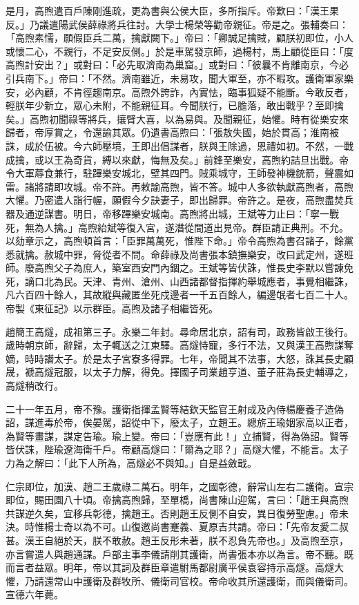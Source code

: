 是月，高煦遣百戶陳剛進疏，更為書與公侯大臣，多所指斥。帝歎曰：「漢王果反。」乃議遣陽武侯薛祿將兵往討。大學士楊榮等勸帝親征。帝是之。張輔奏曰：「高煦素懦，願假臣兵二萬，擒獻闕下。」帝曰：「卿誠足擒賊，顧朕初即位，小人或懷二心，不親行，不足安反側。」於是車駕發京師，過楊村，馬上顧從臣曰：「度高煦計安出？」或對曰：「必先取濟南為巢窟。」或對曰：「彼曩不肯離南京，今必引兵南下。」帝曰：「不然。濟南雖近，未易攻，聞大軍至，亦不暇攻。護衛軍家樂安，必內顧，不肯徑趨南京。高煦外誇詐，內實怯，臨事狐疑不能斷。今敢反者，輕朕年少新立，眾心未附，不能親征耳。今聞朕行，已膽落，敢出戰乎？至即擒矣。」高煦初聞祿等將兵，攘臂大喜，以為易與。及聞親征，始懼。時有從樂安來歸者，帝厚賞之，令還諭其眾。仍遺書高煦曰：「張敖失國，始於貫高；淮南被誅，成於伍被。今六師壓境，王即出倡謀者，朕與王除過，恩禮如初。不然，一戰成擒，或以王為奇貨，縛以來獻，悔無及矣。」前鋒至樂安，高煦約詰旦出戰。帝令大軍蓐食兼行，駐蹕樂安城北，壁其四門。賊乘城守，王師發神機銃箭，聲震如雷。諸將請即攻城。帝不許。再敕諭高煦，皆不答。城中人多欲執獻高煦者，高煦大懼。乃密遣人詣行幄，願假今夕訣妻子，即出歸罪。帝許之。是夜，高煦盡焚兵器及通逆謀書。明日，帝移蹕樂安城南。高煦將出城，王斌等力止曰：「寧一戰死，無為人擒。」高煦紿斌等復入宮，遂潛從間道出見帝。群臣請正典刑。不允。以劾章示之，高煦頓首言：「臣罪萬萬死，惟陛下命。」帝令高煦為書召諸子，餘黨悉就擒。赦城中罪，脅從者不問。命薛祿及尚書張本鎮撫樂安，改曰武定州，遂班師。廢高煦父子為庶人，築室西安門內錮之。王斌等皆伏誅，惟長史李默以嘗諫免死，謫口北為民。天津、青州、滄州、山西諸都督指揮約舉城應者，事覺相繼誅，凡六百四十餘人，其故縱與藏匿坐死戍邊者一千五百餘人，編邊氓者七百二十人。帝製《東征記》以示群臣。高煦及諸子相繼皆死。

趙簡王高燧，成祖第三子。永樂二年封。尋命居北京，詔有司，政務皆啟王後行。歲時朝京師，辭歸，太子輒送之江東驛。高燧恃寵，多行不法，又與漢王高煦謀奪嫡，時時譖太子。於是太子宮寮多得罪。七年，帝聞其不法事，大怒，誅其長史顧晟，褫高燧冠服，以太子力解，得免。擇國子司業趙亨道、董子莊為長史輔導之，高燧稍改行。

二十一年五月，帝不豫。護衛指揮孟賢等結欽天監官王射成及內侍楊慶養子造偽詔，謀進毒於帝，俟晏駕，詔從中下，廢太子，立趙王。總旂王瑜姻家高以正者，為賢等畫謀，謀定告瑜。瑜上變。帝曰：「豈應有此！」立捕賢，得為偽詔。賢等皆伏誅，陛瑜遼海衛千戶。帝顧高燧曰：「爾為之耶？」高燧大懼，不能言。太子力為之解曰：「此下人所為，高燧必不與知。」自是益斂戢。

仁宗即位，加漢、趙二王歲祿二萬石。明年，之國彰德，辭常山左右二護衛。宣宗即位，賜田園八十頃。帝擒高煦歸，至單橋，尚書陳山迎駕，言曰：「趙王與高煦共謀逆久矣，宜移兵彰德，擒趙王。否則趙王反側不自安，異日復勞聖慮。」帝未決。時惟楊士奇以為不可。山復邀尚書蹇義、夏原吉共請。帝曰：「先帝友愛二叔甚。漢王自絕於天，朕不敢赦。趙王反形未著，朕不忍負先帝也。」及高煦至京，亦言嘗遣人與趙通謀。戶部主事李儀請削其護衛，尚書張本亦以為言。帝不聽。既而言者益眾。明年，帝以其詞及群臣章遣駙馬都尉廣平侯袁容持示高燧。高燧大懼，乃請還常山中護衛及群牧所、儀衛司官校。帝命收其所還護衛，而與儀衛司。宣德六年薨。

